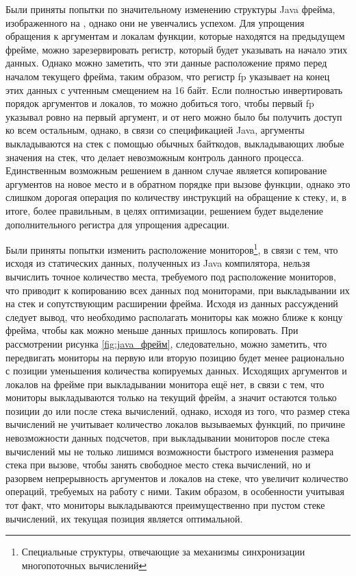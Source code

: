 
Были приняты попытки по значительному изменению структуры Java фрейма, изображенного на , однако они не увенчались успехом. Для упрощения обращения к аргументам и локалам функции, которые находятся на предыдущем фрейме, можно зарезервировать регистр, который будет указывать на начало этих данных. Однако можно заметить, что эти данные расположение прямо перед началом текущего фрейма, таким образом, что регистр fp указывает на конец этих данных с учтенным смещением на 16 байт. Если полностью инвертировать порядок аргументов и локалов, то можно добиться того, чтобы первый fp указывал ровно на первый аргумент, и от него можно было бы получить доступ ко всем остальным, однако, в связи со спецификацией Java, аргументы выкладываются на стек с помощью обычных байткодов, выкладывающих любые значения на стек, что делает невозможным контроль данного процесса. Единственным возможным решением в данном случае является копирование аргументов на новое место и в обратном порядке при вызове функции, однако это слишком дорогая операция по количеству инструкций на обращение к стеку, и, в итоге, более правильным, в целях оптимизации, решением будет выделение дополнительного регистра для упрощения адресации.

Были приняты попытки изменить расположение мониторов\footnote{Специальные структуры, отвечающие за механизмы синхронизации многопоточных вычислений}, в связи с тем, что исходя из статических данных, полученных из Java компилятора, нельзя вычислить точное количество места, требуемого под расположение мониторов, что приводит к копированию всех данных под мониторами, при выкладывании их на стек и сопутствующим расширении фрейма. Исходя из данных рассуждений следует вывод, что необходимо располагать мониторы как можно ближе к концу фрейма, чтобы как можно меньше данных пришлось копировать. При рассмотрении рисунка \ref{fig:java_фрейм}, следовательно, можно заметить, что передвигать мониторы на первую или вторую позицию будет менее рационально с позиции уменьшения количества копируемых данных. Исходящих аргументов и локалов на фрейме при выкладывании монитора ещё нет, в связи с тем, что мониторы выкладываются только на текущий фрейм, а значит остаются только позиции до или после стека вычислений, однако, исходя из того, что размер стека вычислений не учитывает количество локалов вызываемых функций, по причине невозможности данных подсчетов, при выкладывании мониторов после стека вычислений мы не только лишимся возможности быстрого изменения размера стека при вызове, чтобы занять свободное место стека вычислений, но и разорвем непрерывность аргументов и локалов на стеке, что увеличит количество операций, требуемых на работу с ними. Таким образом, в особенности учитывая тот факт, что мониторы выкладываются преимущественно при пустом стеке вычислений, их текущая позиция является оптимальной.



